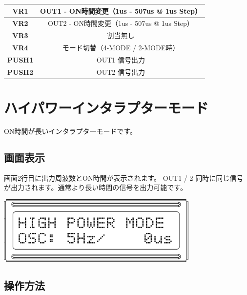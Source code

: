 \documentclass[a4paper,11pt]{jsarticle}
\begin{document}
\begin{table}[htbp]
\begin{center}
\begin{tabular}{ | c | c | }
\hline
\textbf{VR1} & OUT1 - ON時間変更（1us - 507us @ 1us Step） \\\hline
\textbf{VR2} & OUT2 - ON時間変更（1us - 507us @ 1us Step） \\\hline
\textbf{VR3} & 割当無し \\\hline
\textbf{VR4} & モード切替（4-MODE / 2-MODE時） \\\hline
\textbf{PUSH1} & OUT1 信号出力 \\\hline
\textbf{PUSH2} & OUT2 信号出力 \\\hline
\end{tabular}
\end{center}
\end{table}



\clearpage

\section{ハイパワーインタラプターモード}

ON時間が長いインタラプターモードです。

\subsection{画面表示}

画面2行目に出力周波数とON時間が表示されます。 OUT1 / 2 同時に同じ信号が出力されます。通常より長い時間の信号を出力可能です。

\vspace*{5mm}
\begin{center}
\includegraphics[width=100mm]{image/Arduino_Interrupter_v1_LCD_HP.png}
\end{center}
\vspace*{5mm}

\subsection{操作方法}
\end{document}

